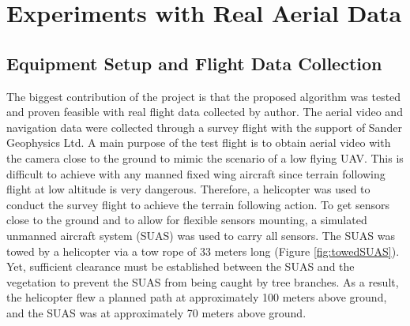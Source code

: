 \chapter{Experiments with Real Aerial Data}
\section{Equipment Setup and Flight Data Collection}
The biggest contribution of the project is that the proposed algorithm
was tested and proven feasible with real flight data collected by
author. The aerial video and navigation data were collected through a
survey flight with the support of Sander Geophysics Ltd. A main
purpose of the test flight is to obtain aerial video with the camera
close to the ground to mimic the scenario of a low flying UAV. This is
difficult to achieve with any manned fixed wing aircraft since terrain
following flight at low altitude is very dangerous. Therefore, a
helicopter was used to conduct the survey flight to achieve the
terrain following action. To get sensors close to the ground and to
allow for flexible sensors mounting, a simulated unmanned aircraft
system (SUAS) was used to carry all sensors. The SUAS was towed by a
helicopter via a tow rope of 33 meters long (Figure
\ref{fig:towedSUAS}). Yet, sufficient clearance must be established
between the SUAS and the vegetation to prevent the SUAS from being
caught by tree branches. As a result, the helicopter flew a planned
path at approximately 100 meters above ground, and the SUAS was at
approximately 70 meters above ground.

